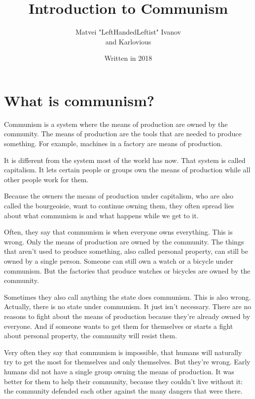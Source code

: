 \documentclass[a4paper]{book} %
\begin{document}
\fontsize{24}{28}\selectfont
\title{Introduction to Communism}
\author{Matvei "LeftHandedLeftist" Ivanov \\ and Karlovious}
\date{Written in 2018}
\maketitle
\fontsize{24}{28}\selectfont
\chapter{What is communism?}
Communism is a system where the means of production are owned by the community. The means of production are the tools that are needed to produce something. For example, machines in a factory are means of production.

It is different from the system most of the world has now. That system is called capitalism. It lets certain people or groups own the means of production while all other people work for them.

Because the owners the means of production under capitalism, who are also called the bourgeoisie, want to continue owning them, they often spread lies about what communism is and what happens while we get to it.

Often, they say that communism is when everyone owns everything. This is wrong. Only the means of production are owned by the community. The things that aren't used to produce something, also called personal property, can still be owned by a single person. Someone can still own a watch or a bicycle under communism. But the factories that produce watches or bicycles are owned by the community.

Sometimes they also call anything the state does communism. This is also wrong. Actually, there is no state under communism. It just isn't necessary. There are no reasons to fight about the means of production because they're already owned by everyone. And if someone wants to get them for themselves or starts a fight about personal property, the community will resist them.

Very often they say that communism is impossible, that humans will naturally try to get the most for themselves and only themselves. But they're wrong. Early humans did not have a single group owning the means of production. It was better for them to help their community, because they couldn't live without it: the community defended each other against the many dangers that were there.
\end{document}
